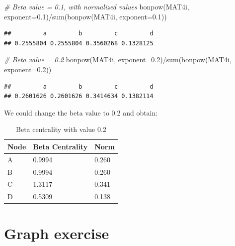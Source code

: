 \documentclass[
  notitlepage,
  onecolumn,
  openany]{book}
\newenvironment{Shaded}{\begin{snugshade}}{\end{snugshade}}
\newcommand{\AttributeTok}[1]{\textcolor[rgb]{0.77,0.63,0.00}{#1}}
\newcommand{\CommentTok}[1]{\textcolor[rgb]{0.56,0.35,0.01}{\textit{#1}}}
\newcommand{\FloatTok}[1]{\textcolor[rgb]{0.00,0.00,0.81}{#1}}
\newcommand{\FunctionTok}[1]{\textcolor[rgb]{0.00,0.00,0.00}{#1}}
\newcommand{\NormalTok}[1]{#1}
\newcommand{\SpecialCharTok}[1]{\textcolor[rgb]{0.00,0.00,0.00}{#1}}
\begin{document}
\begin{Shaded}
\begin{Highlighting}[]
\CommentTok{\# Beta value = 0.1, with normalized values}
\FunctionTok{bonpow}\NormalTok{(MAT4i, }\AttributeTok{exponent=}\FloatTok{0.1}\NormalTok{)}\SpecialCharTok{/}\FunctionTok{sum}\NormalTok{(}\FunctionTok{bonpow}\NormalTok{(MAT4i, }\AttributeTok{exponent=}\FloatTok{0.1}\NormalTok{))}
\end{Highlighting}
\end{Shaded}

\begin{verbatim}
##         a         b         c         d 
## 0.2555804 0.2555804 0.3560268 0.1328125
\end{verbatim}

\begin{Shaded}
\begin{Highlighting}[]
\CommentTok{\# Beta value = 0.2}
\FunctionTok{bonpow}\NormalTok{(MAT4i, }\AttributeTok{exponent=}\FloatTok{0.2}\NormalTok{)}\SpecialCharTok{/}\FunctionTok{sum}\NormalTok{(}\FunctionTok{bonpow}\NormalTok{(MAT4i, }\AttributeTok{exponent=}\FloatTok{0.2}\NormalTok{))}
\end{Highlighting}
\end{Shaded}

\begin{verbatim}
##         a         b         c         d 
## 0.2601626 0.2601626 0.3414634 0.1382114
\end{verbatim}

We could change the beta value to 0.2 and obtain:

\begin{table}[h]
\centering
\begin{tabular}{@{}lll@{}}
\toprule
\textbf{Node} & \textbf{Beta Centrality} & \textbf{Norm} \\ \midrule
A             & 0.9994                   & 0.260         \\
B             & 0.9994                   & 0.260         \\
C             & 1.3117                   & 0.341         \\
D             & 0.5309                   & 0.138         \\ \bottomrule
\end{tabular}
\caption{Beta centrality with \beta value 0.2}
\label{tab:my-table}
\end{table}

\hypertarget{graph-exercise}{%
\section{Graph exercise}\label{graph-exercise}}
\end{document}
